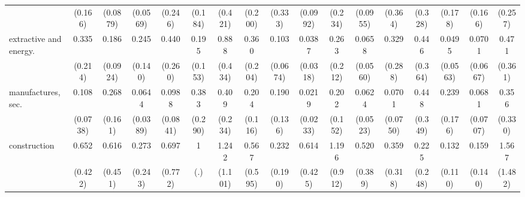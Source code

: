 {\begin{tabular}{l*{16}{c}}
                    &     (0.166)         &    (0.0879)         &    (0.0569)         &     (0.246)         &     (0.184)         &     (0.421)         &     (0.200)         &     (0.333)         &    (0.0992)         &     (0.234)         &    (0.0955)         &     (0.364)         &     (0.328)         &     (0.178)         &     (0.166)         &     (0.257)         \\
[1em]
extractive and energy.&       0.335         &       0.186\sym{***}&       0.245\sym{*}  &       0.440         &       0.195\sym{*}  &       0.888         &       0.360         &       0.103\sym{***}&      0.0387\sym{***}&       0.263         &      0.0658\sym{**} &       0.329         &       0.446         &      0.0495\sym{**} &      0.0701\sym{**} &       0.471         \\
                    &     (0.214)         &    (0.0924)         &     (0.140)         &     (0.260)         &     (0.153)         &     (0.434)         &     (0.204)         &    (0.0674)         &    (0.0318)         &     (0.212)         &    (0.0560)         &     (0.288)         &     (0.364)         &    (0.0563)         &    (0.0667)         &     (0.361)         \\
[1em]
manufactures, sec.  &       0.108\sym{**} &       0.268\sym{*}  &      0.0644\sym{***}&      0.0988\sym{**} &       0.383         &       0.409         &       0.204\sym{**} &       0.190\sym{*}  &      0.0219\sym{***}&       0.202\sym{*}  &      0.0624\sym{***}&      0.0701\sym{*}  &       0.448         &       0.239         &      0.0681\sym{**} &       0.356         \\
                    &    (0.0738)         &     (0.161)         &    (0.0389)         &    (0.0841)         &     (0.290)         &     (0.234)         &     (0.116)         &     (0.136)         &    (0.0233)         &     (0.152)         &    (0.0523)         &    (0.0750)         &     (0.349)         &     (0.176)         &    (0.0707)         &     (0.330)         \\
[1em]
construction        &       0.652         &       0.616         &       0.273         &       0.697         &           1         &       1.242         &       0.567         &       0.232         &       0.614         &       1.196         &       0.520         &       0.359         &       0.225         &       0.132\sym{*}  &       0.159\sym{*}  &       1.567         \\
                    &     (0.422)         &     (0.451)         &     (0.243)         &     (0.772)         &         (.)         &     (1.101)         &     (0.595)         &     (0.190)         &     (0.425)         &     (0.912)         &     (0.389)         &     (0.318)         &     (0.248)         &     (0.110)         &     (0.140)         &     (1.482)         \\

\end{tabular}}
